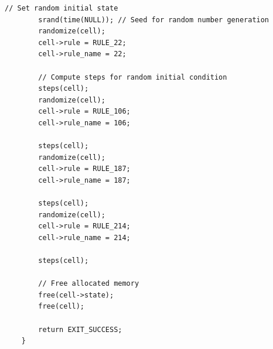 \documentclass[12pt,a4paper]{article}
\begin{document}
\begin{lstlisting}[caption={\small 1d\_states.c},label={lst:p7001},basicstyle=\ttfamily\tiny]
        // Set random initial state
        srand(time(NULL)); // Seed for random number generation
        randomize(cell);
        cell->rule = RULE_22;
        cell->rule_name = 22;

        // Compute steps for random initial condition
        steps(cell);
        randomize(cell); 
        cell->rule = RULE_106;
        cell->rule_name = 106;

        steps(cell);
        randomize(cell); 
        cell->rule = RULE_187;
        cell->rule_name = 187;

        steps(cell);
        randomize(cell); 
        cell->rule = RULE_214;
        cell->rule_name = 214;

        steps(cell);

        // Free allocated memory
        free(cell->state);
        free(cell);

        return EXIT_SUCCESS;
    }
\end{lstlisting}


\vspace{1cm}

\end{document}
